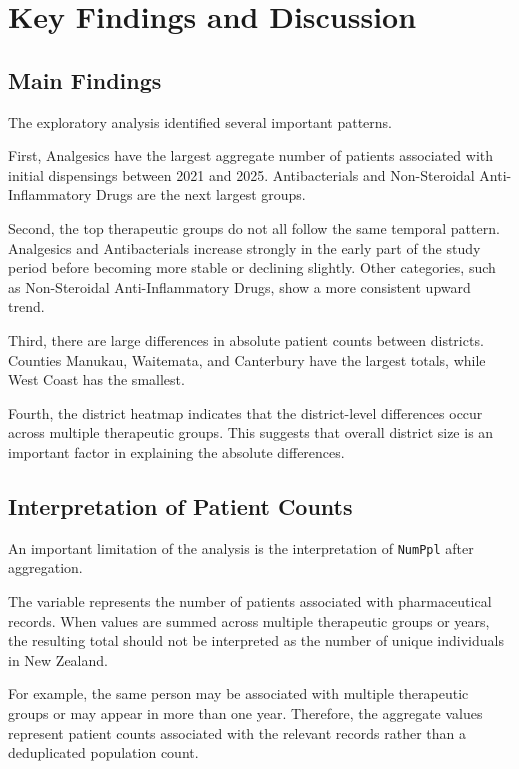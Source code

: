 \documentclass[11pt,a4paper]{report}
\begin{document}
\chapter{Key Findings and Discussion}

\section{Main Findings}

The exploratory analysis identified several important patterns.

First, Analgesics have the largest aggregate number of patients associated with initial dispensings between 2021 and 2025. Antibacterials and Non-Steroidal Anti-Inflammatory Drugs are the next largest groups.

Second, the top therapeutic groups do not all follow the same temporal pattern. Analgesics and Antibacterials increase strongly in the early part of the study period before becoming more stable or declining slightly. Other categories, such as Non-Steroidal Anti-Inflammatory Drugs, show a more consistent upward trend.

Third, there are large differences in absolute patient counts between districts. Counties Manukau, Waitemata, and Canterbury have the largest totals, while West Coast has the smallest.

Fourth, the district heatmap indicates that the district-level differences occur across multiple therapeutic groups. This suggests that overall district size is an important factor in explaining the absolute differences.


\section{Interpretation of Patient Counts}

An important limitation of the analysis is the interpretation of \texttt{NumPpl} after aggregation.

The variable represents the number of patients associated with pharmaceutical records. When values are summed across multiple therapeutic groups or years, the resulting total should not be interpreted as the number of unique individuals in New Zealand.

For example, the same person may be associated with multiple therapeutic groups or may appear in more than one year. Therefore, the aggregate values represent patient counts associated with the relevant records rather than a deduplicated population count.
\end{document}

